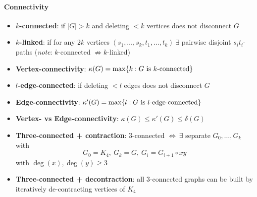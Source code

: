 \paragraph{Connectivity}
\begin{itemize}
  \item \textbf{$ k $-connected}: if $ \vert G \vert > k $ and deleting $ < k $ vertices does not disconnect $ G $
  \item \textbf{$ k $-linked}: if for any $ 2k $ vertices $ (s_1, \dots, s_k, t_1, \dots, t_k) \ \exists $ pairwise disjoint $ s_it_i $-paths (\emph{note}: $ k $-connected $ \not \Rightarrow k $-linked)
  \item \textbf{Vertex-connectivity}: $ \kappa(G) = \max\{ k : \text{$ G $ is $ k $-connected} \} $
  \item \textbf{$ l $-edge-connected}: if deleting $ < l $ edges does not disconnect $ G $
  \item \textbf{Edge-connectivity}: $ \kappa'(G) = \max\{ l : \text{$ G $ is $ l $-edge-connected} \} $
  \item \textbf{Vertex- vs Edge-connectivity}: $ \kappa(G) \leq \kappa'(G) \leq \delta(G) $
  \item \textbf{Three-connected + contraction}: $ 3 $-connected $ \Leftrightarrow \ \exists $ separate $ G_0, \dots, G_k $ with
  \begin{equation*}
    G_0 = K_4, \ G_k = G, \ G_i = G_{i+1} \circ xy
  \end{equation*}
  with $ \deg(x), \deg(y) \geq 3 $
  \item \textbf{Three-connected + decontraction}: all $ 3 $-connected graphs can be built by iteratively de-contracting vertices of $ K_4 $
\end{itemize}

